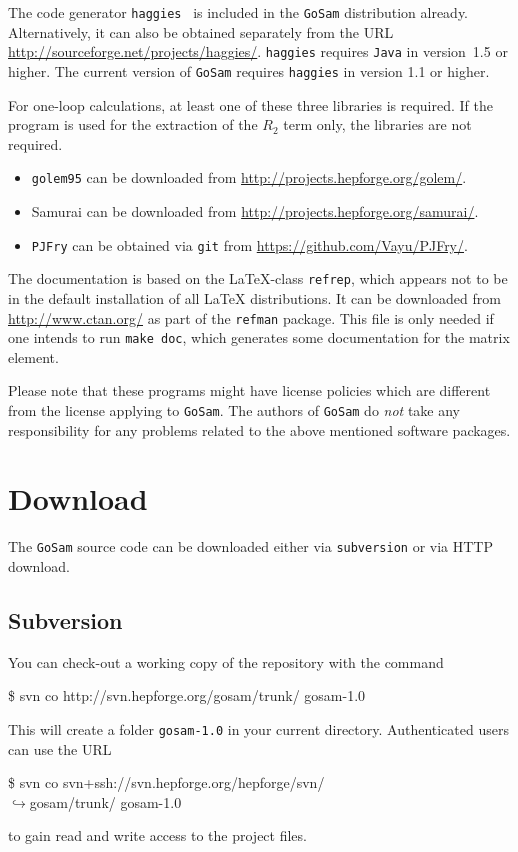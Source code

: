 \documentclass[11pt,a4paper]{refrep}
\newcommand{\golemversion}{{1{.}0}}
\newcommand{\golem}{{\tt GoSam}\xspace}
\newcommand{\golemv}[1][\golemversion]{{\tt GoSam}\xspace}
\newcommand{\golemVC}{{\tt golem95}\xspace}
\newcommand{\pjfry}{{\tt PJFry}\xspace}
\newcommand{\haggies}{{\tt haggies}\xspace}
\newcommand{\samurai}{{\sc Samurai}\xspace}
\newcommand{\contl}{{\ensuremath{\hookrightarrow}}}
\begin{document}
\marginlabel{\haggies (2)} The code generator \haggies{}~\cite{Reiter:2009ts}
is included in the \golemv{} distribution already.
Alternatively, it can also be obtained separately from the URL
\url{http://sourceforge.net/projects/haggies/}.
\haggies requires \texttt{Java} in version~1{.}5 or higher.
The current version of \golemv requires \haggies{} in version 1{.}1 or
higher.

\marginlabel{\golemVC/\samurai/\pjfry (3)}
For one-loop calculations, at least one of these three libraries is
required. If the program is used for the extraction of the $R_2$ term
only, the libraries are not required.
\begin{itemize}
\item \golemVC can be downloaded from
\url{http://projects.hepforge.org/golem/}.
\item \samurai can be downloaded from
\url{http://projects.hepforge.org/samurai/}.
\item \pjfry can be obtained via \texttt{git} from
\url{https://github.com/Vayu/PJFry/}.
\end{itemize}

 The documentation
is based on the \LaTeX-class \texttt{refrep}, which appears
not to be in the default installation of all \LaTeX{}
distributions. It can be downloaded from \url{http://www.ctan.org/}
as part of the \texttt{refman} package.
This file is only needed if one intends to run \texttt{make doc},
which generates some documentation for the matrix element.

\attention Please note that these programs might have
license policies which are different from the license
applying to \golemv. The authors of \golem do \emph{not}
take any responsibility for any problems related to the
above mentioned software packages.

\section{Download}
The \golemv{} source code can be downloaded either via \texttt{subversion}
or via HTTP download.

\subsection{Subversion}
You can check-out a working copy of the repository with the command
\begin{example}
\$ svn co http://svn.hepforge.org/gosam/trunk/ gosam-\golemversion{}
\end{example}
This will create a folder \texttt{gosam-\golemversion} in your current directory.
Authenticated users can use the URL
\begin{example}
\$ svn co svn+ssh://svn.hepforge.org/hepforge/svn/\\
   \contl{}gosam/trunk/ gosam-\golemversion{}
\end{example}
to gain read and write access to the project files.
\end{document}
